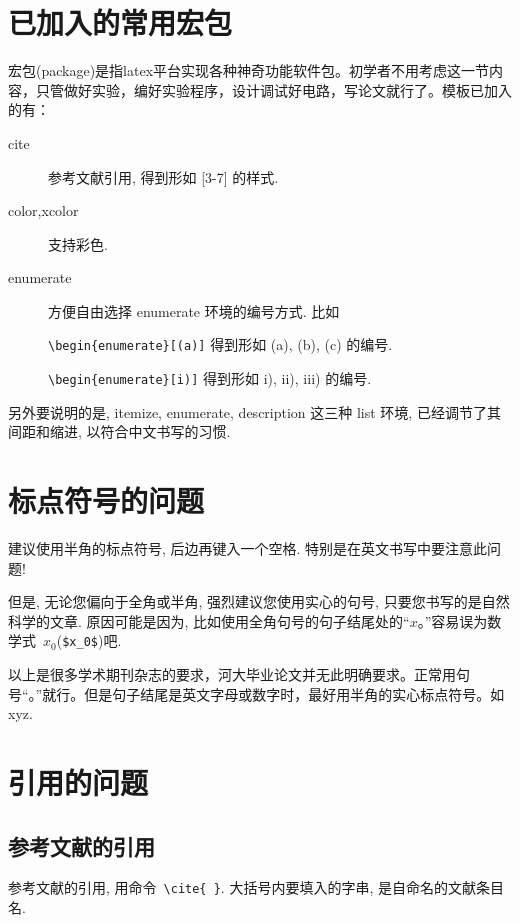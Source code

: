 \documentclass[forprint]{HedaBachelor}
\begin{document}
\section{已加入的常用宏包}

宏包(package)是指latex平台实现各种神奇功能软件包。初学者不用考虑这一节内容，只管做好实验，编好实验程序，设计调试好电路，写论文就行了。模板已加入的有：

\begin{description}
  \item[cite]  参考文献引用, 得到形如 [3-7] 的样式.
  \item[color,xcolor]  支持彩色.
  \item[enumerate]  方便自由选择 enumerate 环境的编号方式. 比如

  \verb|\begin{enumerate}[(a)]| 得到形如 (a), (b), (c) 的编号.


  \verb|\begin{enumerate}[i)]| 得到形如 i), ii), iii) 的编号.

\end{description}

另外要说明的是,  itemize, enumerate, description 这三种 list 环境, 已经调节了其间距和缩进,
以符合中文书写的习惯.

\section{标点符号的问题}

建议使用半角的标点符号, 后边再键入一个空格. 特别是在英文书写中要注意此问题!

但是, 无论您偏向于全角或半角, 强烈建议您使用实心的句号, 只要您书写的是自然科学的文章.
原因可能是因为, 比如使用全角句号的句子结尾处的“$x$。”容易误为数学式~$x_0$(\verb|$x_0$|)吧.

以上是很多学术期刊杂志的要求，河大毕业论文并无此明确要求。正常用句号“。”就行。但是句子结尾是英文字母或数字时，最好用半角的实心标点符号。如 xyz.

\section{引用的问题}


\subsection{参考文献的引用}

参考文献的引用, 用命令~\verb|\cite{ }|. 大括号内要填入的字串, 是自命名的文献条目名.
\end{document}
